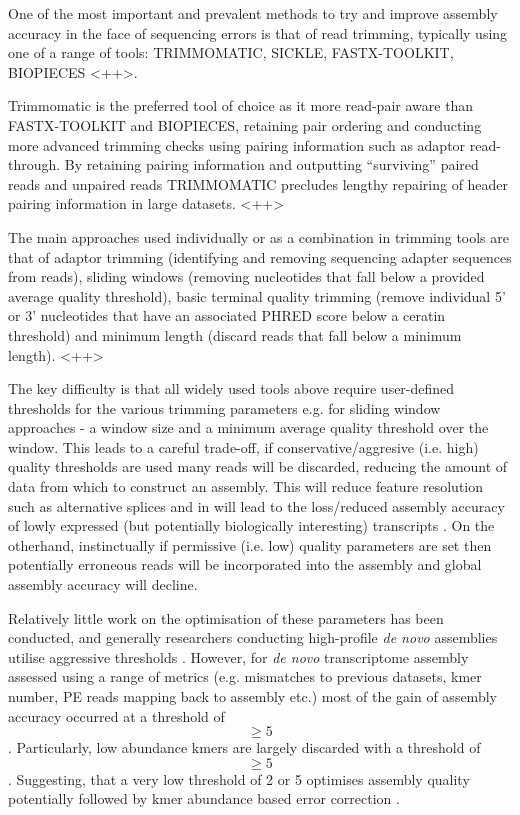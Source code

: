 One of the most important and prevalent methods to try and improve assembly
accuracy in the face of sequencing errors is that of read trimming, typically
using one of a range of tools: TRIMMOMATIC, SICKLE, FASTX-TOOLKIT, BIOPIECES \citep{}<++>. %

Trimmomatic is the preferred tool of choice as it more read-pair aware than
FASTX-TOOLKIT and BIOPIECES, retaining pair ordering and conducting more
advanced trimming checks using pairing information such as adaptor read-through.
By retaining pairing information and outputting ``surviving'' paired reads and
unpaired reads TRIMMOMATIC precludes lengthy repairing of header pairing information
in large datasets. \citep{}<++> %

The main approaches used individually or as a combination in trimming tools are that 
of adaptor trimming (identifying and removing sequencing adapter sequences from reads),
sliding windows (removing nucleotides that fall below a provided average quality threshold),
basic terminal quality trimming (remove individual 5' or 3' nucleotides that have an associated PHRED score
below a ceratin threshold) and minimum length (discard reads that fall below a minimum length). 
\citep{}<++> %

The key difficulty is that all widely used tools above require user-defined thresholds
for the various trimming parameters e.g. for sliding window approaches - a window size
and a minimum average quality threshold over the window.  
This leads to a careful trade-off, if conservative/aggresive (i.e. high) quality thresholds
are used many reads will be discarded, reducing the amount of data from which to 
construct an assembly.  This will reduce feature resolution such as alternative splices 
and in will lead to the loss/reduced assembly accuracy of lowly expressed (but potentially biologically interesting) transcripts \citep{MacManes2014}. On the otherhand, instinctually if permissive (i.e. low)
quality parameters are set then potentially erroneous reads will be incorporated into the assembly
and global assembly accuracy will decline. 

Relatively little work on the optimisation of these parameters has been conducted, and generally
researchers conducting high-profile \textit{de novo} assemblies utilise aggressive thresholds \citep{MacManes2014}.
However, for \textit{de novo} transcriptome assembly assessed using a range of metrics
(e.g. mismatches to previous datasets, kmer number, PE reads mapping back to assembly etc.)
most of the gain of assembly accuracy occurred at a threshold of \[\geq 5\].
Particularly, low abundance kmers are largely discarded with a threshold of \[\geq 5\].
Suggesting, that a very low threshold of 2 or 5 optimises assembly quality potentially
followed by kmer abundance based error correction \citep{MacManes2014}.



